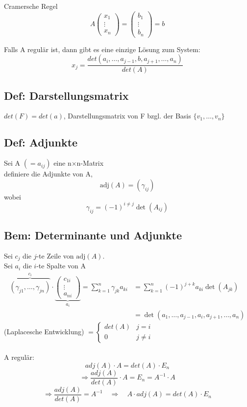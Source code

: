 \documentclass[titlepage,12pt,a4paper,ngerman]{report}
\begin{document}
Cramersche Regel
$$A \begin{pmatrix}
x_1\\
\vdots\\
x_n
\end{pmatrix}
= \begin{pmatrix}
b_1\\
\vdots\\
b_n
\end{pmatrix}
= b
$$

Falls A regulär ist, dann gibt es eine einzige Lösung zum System:
$$ x_j = \frac{det(a_i,\dots,a_{j-1},b,a_{j+1},\dots , a_n)}{det(A)}$$
\subsection{Def: Darstellungsmatrix}
$det(F) = det(a)$, Darstellungsmatrix von F bzgl. der Basis $\{v_1,\dots , v_n\}$
\subsection{Def: Adjunkte} Sei A $(= a_{ij})$ eine n$\times$n-Matrix\\
definiere die Adjunkte von A,  
$$\textrm{adj}(A) = (\gamma_{ij})$$ wobei $$\gamma_{ij} = (-1)^{i\neq j} \det(A_{ij})$$
\subsection{Bem: Determinante und Adjunkte}
Sei $c_j$ die $j$-te Zeile von $\textrm{adj}(A)$.\\
Sei $a_i$ die $i$-te Spalte von A 
\begin{align*}\overbrace{(\gamma_{j1}, \dots , \gamma_{jn})}^{c_i} \cdot \underbrace{\begin{pmatrix} c_{1i}\\ \vdots\\ a_{ni} \end{pmatrix}}_{a_i}  = \sum_{k=1}^n \gamma_{jk} a_{ki} &= \sum_{k=1}^n (-1)^{j+k} a_{ki} \det(A_{jk}) \\ &= \det(a_1, \dots , a_{j-1}, a_i , a_{j+1}, \dots , a_n) \end{align*}
(Laplacesche Entwicklung) $ = \left\{\begin{array}{ll} det(A) & j=i \\ 0 & j\neq i \end{array}\right.$\\\\
A regulär:
$$adj(A) \cdot A = det(A) \cdot E_n$$
$$\Rightarrow \frac{adj(A)}{det(A)} \cdot A = E_n = A^{-1} \cdot A$$
$$\Rightarrow \frac{adj(A)}{det(A)} = A^{-1} \quad \Rightarrow \quad A \cdot adj(A) = det(A) \cdot E_n$$
\end{document}

